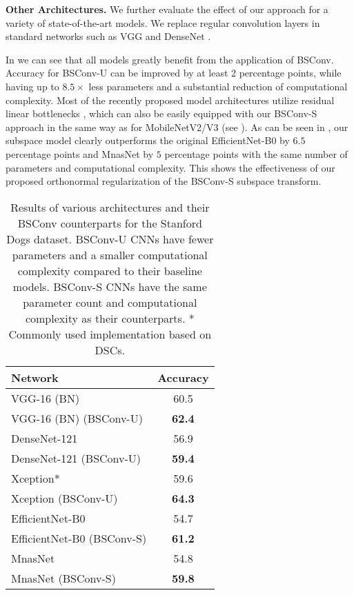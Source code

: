 \documentclass[10pt,twocolumn,letterpaper]{article}
\newcommand{\DCCK}{BSConv\xspace}
\newcommand{\DCCKU}{\DCCK-U\xspace}
\newcommand{\DCCKS}{\DCCK-S\xspace}
\begin{document}
\textbf{Other Architectures.}
We further evaluate the effect of our approach for a variety of state-of-the-art models.
We replace regular convolution layers in standard networks such as VGG \cite{simonyan2014very} and DenseNet \cite{huang2017densely}.

In  we can see that all models greatly benefit from the application of \DCCK.
Accuracy for \DCCKU can be improved by at least 2 percentage points, while having up to $8.5 \times$ less parameters and a substantial reduction of computational complexity.
Most of the recently proposed model architectures utilize residual linear bottlenecks \cite{sandler2018mobilenetv2}, which can also be easily equipped with our \DCCKS approach in the same way as for MobileNetV2/V3 (see ).
As can be seen in , our subspace model clearly outperforms the original EfficientNet-B0 \cite{tan2019efficientnet} by $6.5$ percentage points and MnasNet \cite{tan2019mnasnet} by $5$ percentage points with the same number of parameters and computational complexity.
This shows the effectiveness of our proposed orthonormal regularization of the \DCCKS subspace transform.

\begin{table}
	\begin{center}
		\begin{tabular}{|l|c|}
			\hline
			Network & Accuracy \\
			\hline
			VGG-16 (BN) \cite{simonyan2014very}	& 60.5 \\
			VGG-16 (BN) (\DCCKU) 				& \bf{62.4} \\
			\hline
			DenseNet-121 \cite{huang2017densely}	& 56.9 \\
			DenseNet-121 (\DCCKU) 				& \bf{59.4} \\
			\hline
			Xception* \cite{chollet2017xception}	& 59.6 \\
			Xception (\DCCKU) 					& \bf{64.3} \\
			\hline
			EfficientNet-B0 \cite{tan2019efficientnet}	& 54.7 \\
			EfficientNet-B0 (\DCCKS)				& \bf{61.2} \\
			\hline
			MnasNet \cite{tan2019mnasnet}			& 54.8 \\
			MnasNet (\DCCKS)						& \bf{59.8} \\
			\hline
			\end{tabular}
		\end{center}
	\caption{Results of various architectures and their \DCCK counterparts for the Stanford Dogs dataset.
		\DCCKU CNNs have fewer parameters and a smaller computational complexity compared to their baseline models.
		\DCCKS CNNs have the same parameter count and computational complexity as their counterparts.
		* Commonly used implementation based on DSCs.
	}
	\label{tab:dogsOthers}
\end{table}
\end{document}
